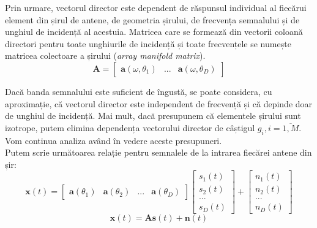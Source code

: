 Prin urmare, vectorul director este dependent de răspunsul individual al
fiecărui element din șirul de antene, de geometria șirului, de frecvența
semnalului și de unghiul de incidență al acestuia. Matricea care se formează din
vectorii coloană directori pentru toate unghiurile de incidență și toate
frecvențele se numește matricea colectoare a șirului
(\textit{array manifold matrix}).
\begin{equation}
    \bm{A} = 
	    \begin{bmatrix}
		\bm{a}(\omega, \theta_1) & ... & \bm{a}(\omega, \theta_D)
	    \end{bmatrix}
\end{equation}

Dacă banda semnalului este suficient de îngustă, se poate considera, cu
aproximație, că vectorul director este independent de frecvență și că depinde doar
de unghiul de incidență. Mai mult, dacă presupunem că elementele șirului sunt
izotrope, putem elimina dependența vectorului director de câștigul $g_i,
i = \overline{1, M}$. Vom continua analiza având în vedere aceste presupuneri.\\

Putem scrie următoarea relație pentru semnalele de la intrarea fiecărei antene
din șir:
\begin{equation}
\label{eq:xasn}    
    \bm{x}(t) = 
	\begin{bmatrix}
	   \bm{a}(\theta_1) & \bm{a}(\theta_2) & ... & \bm{a}(\theta_D)
	\end{bmatrix}
	\begin{bmatrix}
	    s_1(t) \\ s_2(t) \\ ... \\ s_D(t)
	\end{bmatrix}
	+
	\begin{bmatrix}
	    n_1(t) \\ n_2(t) \\ ... \\ n_D(t)
	\end{bmatrix}
\end{equation}
\begin{equation}
\label{eq:xasn-short}
    \bm{x}(t) = \bm{A}\bm{s}(t) + \bm{n}(t)
\end{equation}

